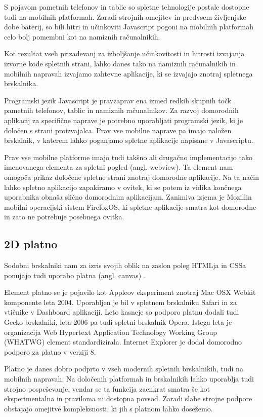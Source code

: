 S pojavom pametnih telefonov in tablic so spletne tehnologije postale dostopne tudi na mobilnih platformah. Zaradi strojnih omejitev in predvsem življenjske dobe baterij, so bili hitri in učinkoviti Javascript pogoni na mobilnih platformah celo bolj pomembni kot na namiznih računalnikih.

Kot rezultat vseh prizadevanj za izboljšanje učinkovitosti in hitrosti izvajanja izvorne kode spletnih strani, lahko danes tako na namiznih računalnikih in mobilnih napravah izvajamo zahtevne aplikacije, ki se izvajajo znotraj spletnega brskalnika.

Programski jezik Javascript je pravzaprav ena izmed redkih skupnih točk pametnih telefonov, tablic in namiznih računalnikov. Za razvoj domorodnih aplikacij za specifične naprave je potrebno uporabljati programski jezik, ki je določen s strani proizvajalca. Prav vse mobilne naprave pa imajo naložen brskalnik, v katerem lahko poganjamo spletne aplikacije napisane v Javascriptu.

Prav vse mobilne platforme imajo tudi takšno ali drugačno implementacijo tako imenovanega elementa za spletni pogled (angl. webview). Ta element nam omogoča prikaz določene spletne strani znotraj domorodne aplikacije. Na ta način lahko spletno aplikacijo zapakiramo v ovitek, ki se potem iz vidika končnega uporabnika obnaša slično domorodnim aplikacijam. Zanimiva izjema je Mozillin mobilni operacijski sistem FirefoxOS, ki spletne aplikacije smatra kot domorodne in zato ne potrebuje posebnega ovitka.

\subsection{2D platno}
\label{sec:2dcanvas}
Sodobni brskalniki nam za izris svojih oblik na zaslon poleg HTMLja in CSSa ponujajo tudi uporabo platna (angl. canvas) \cite{canvas}. 

Element platno se je pojavilo kot Appleov eksperiment znotraj Mac OSX Webkit komponente leta 2004. Uporabljen je bil v spletnem brskalniku Safari in za vtičnike v Dashboard aplikaciji. Leto kasneje so podporo platnu dodali tudi Gecko brskalniki, leta 2006 pa tudi spletni brskalnik Opera. Istega leta je organizacija Web Hypertext Application Technology Working Group (WHATWG) element standardizirala. Internet Explorer je dodal domorodno podporo za platno v verziji 8.

Platno je danes dobro podprto v vseh modernih spletnih brskalnikih, tudi na mobilnih napravah. Na določenih platformah in brskalnikih lahko uporablja tudi strojno pospeševanje, vendar se ta funkcija zaenkrat smatra še kot eksperimentalna in praviloma ni dostopna povsod. Zaradi slabe strojne podpore obstajajo omejitve kompleksnosti, ki jih s platnom lahko dosežemo.

